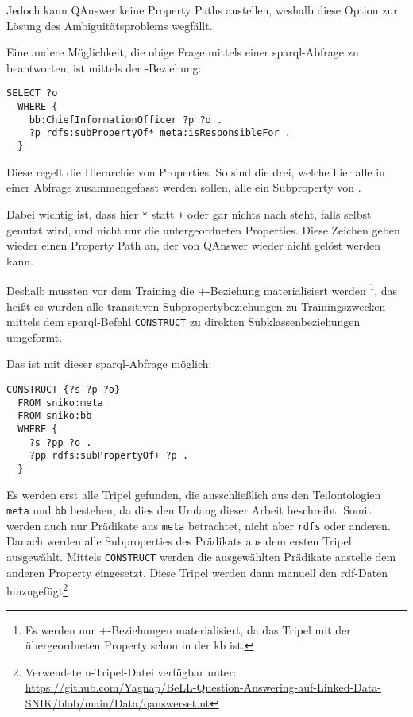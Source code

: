 Jedoch kann QAnswer keine Property Paths austellen, weshalb diese Option zur Lösung des Ambiguitätsproblems wegfällt.

Eine andere Möglichkeit, die obige Frage mittels einer \ac{sparql}-Abfrage zu beantworten, ist mittels der -Beziehung:
\begin{lstlisting}[language=SPARQL]
  SELECT ?o
  WHERE {
    bb:ChiefInformationOfficer ?p ?o .
    ?p rdfs:subPropertyOf* meta:isResponsibleFor .
  }
\end{lstlisting}

Diese regelt die Hierarchie von Properties.
So sind die drei, welche hier alle in einer Abfrage zusammengefasst werden sollen, alle ein Subproperty von .

Dabei wichtig ist, dass hier \texttt{*} statt \texttt{+} oder gar nichts nach  steht, falls  selbst genutzt wird,
und nicht nur die untergeordneten Properties.
Diese Zeichen geben wieder einen Property Path an, der von QAnswer wieder nicht gelöst werden kann.

Deshalb mussten vor dem Training die +-Beziehung materialisiert werden%
\footnote{Es werden nur +-Beziehungen materialisiert, da das Tripel mit der übergeordneten Property schon in der \ac{kb} ist.},
das heißt es wurden alle transitiven Subpropertybeziehungen zu Trainingszwecken mittels dem \ac{sparql}-Befehl \texttt{CONSTRUCT} zu direkten Subklassenbeziehungen umgeformt.

Das ist mit dieser \ac{sparql}-Abfrage möglich:
\begin{lstlisting}[language=SPARQL]
  CONSTRUCT {?s ?p ?o}
  FROM sniko:meta
  FROM sniko:bb
  WHERE {
    ?s ?pp ?o .
    ?pp rdfs:subPropertyOf+ ?p . 
  }
\end{lstlisting}

Es werden erst alle Tripel gefunden, die ausschließlich aus den Teilontologien \texttt{meta} und \texttt{bb} bestehen, da dies den Umfang dieser Arbeit beschreibt.
Somit werden auch nur Prädikate aus \texttt{meta} betrachtet, nicht aber \texttt{rdfs} oder anderen.
Danach werden alle Subproperties des Prädikats aus dem ersten Tripel ausgewählt.
Mittels \texttt{CONSTRUCT} werden die ausgewählten Prädikate anstelle dem anderen Property eingesetzt.
Diese Tripel werden dann manuell den \ac{rdf}-Daten hinzugefügt\footnote{Verwendete n-Tripel-Datei verfügbar unter:\\\url{https://github.com/Yagnap/BeLL-Question-Answering-auf-Linked-Data-SNIK/blob/main/Data/qanswerset.nt}}

